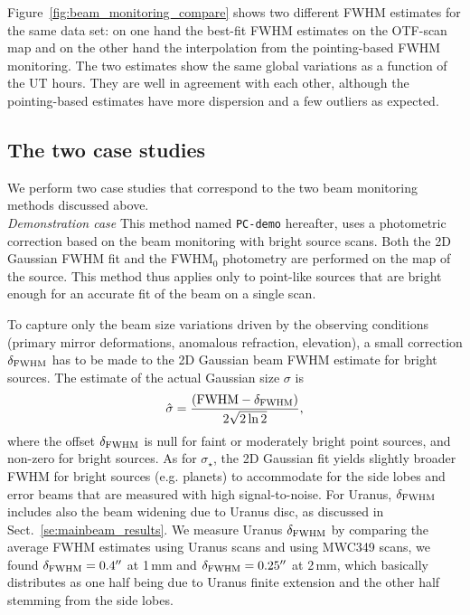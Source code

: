 %
Figure~\ref{fig:beam_monitoring_compare} shows two different FWHM %
estimates for the same data set: on one hand the best-fit FWHM %
estimates on the OTF-scan map and on the other hand the interpolation from
the pointing-based FWHM %
monitoring. The two estimates show the same global variations as a
function of the UT hours. They are well in agreement with each
other, although the pointing-based estimates have more dispersion and
a few outliers as expected.


\subsection{The two case studies}

We perform two case studies that correspond to the two beam monitoring
methods discussed above.\\

\noindent \emph{Demonstration case} This method named {\tt PC-demo} hereafter, uses a
photometric correction based on the beam monitoring with bright source
scans. Both the 2D Gaussian FWHM fit and the FWHM$_0$ photometry are performed
on the map of the source. This method thus applies only to point-like sources
that are bright enough for an accurate fit of the beam on a single scan.

To capture only the beam size variations driven by the
observing conditions (primary mirror deformations, anomalous
refraction, elevation), a small correction $\delta_{\rm{FWHM}}$ has to be made to
the 2D Gaussian beam FWHM estimate for bright sources. The estimate of the
actual Gaussian size $\sigma$ is
\begin{equation}
  \hat{\sigma} = \frac{(\rm{FWHM} - \delta_{\rm{FWHM}})}{2\sqrt{2 \ln{2}}}, 
\end{equation} 
where the offset $\delta_{\rm{FWHM}}$ is null for faint or moderately
bright point sources, and non-zero for bright sources.
As for $\sigma_\star$, the 2D Gaussian fit yields slightly broader
FWHM for bright sources (e.g. planets) to accommodate
for the side lobes and error beams that are measured with high signal-to-noise.
For Uranus, $\delta_{\rm{FWHM}}$ includes also the beam widening due
to Uranus disc, as discussed in Sect.~\ref{se:mainbeam_results}.
We measure Uranus $\delta_{\rm{FWHM}}$
by comparing the average %
FWHM estimates using Uranus
scans and using MWC349 scans, we found $\delta_{\rm{FWHM}} = 0.4''$ at
1\,mm and $\delta_{\rm{FWHM}} = 0.25''$ at 2\,mm, which basically
distributes as one half being due to Uranus finite extension and the
other half stemming from the side lobes.\\

